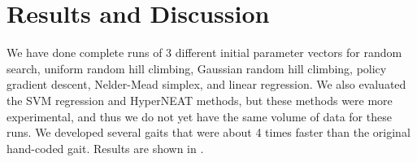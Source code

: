 \section{Results and Discussion}



We have done complete runs of 3 different initial parameter vectors
for random search, uniform random hill climbing, Gaussian random hill
climbing, policy gradient descent, Nelder-Mead simplex, and linear
regression.  We also evaluated the SVM regression and HyperNEAT
methods, but these methods were more experimental, and thus we do not
yet have the same volume of data for these runs.  We developed several
gaits that were about 4 times faster than the original hand-coded
gait.  Results are shown in .



